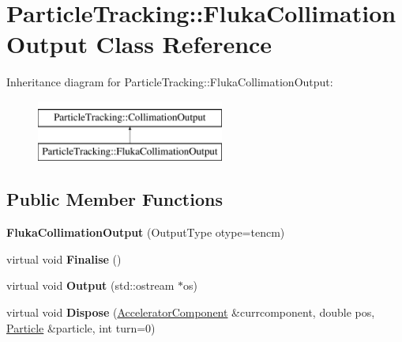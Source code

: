 \hypertarget{classParticleTracking_1_1FlukaCollimationOutput}{}\section{Particle\+Tracking\+:\+:Fluka\+Collimation\+Output Class Reference}
\label{classParticleTracking_1_1FlukaCollimationOutput}
Inheritance diagram for Particle\+Tracking\+:\+:Fluka\+Collimation\+Output\+:\begin{figure}[H]
\begin{center}
\leavevmode
\includegraphics[height=2.000000cm]{classParticleTracking_1_1FlukaCollimationOutput}
\end{center}
\end{figure}
\subsection*{Public Member Functions}
\begin{DoxyCompactItemize}
\item 
\mbox{\label{classParticleTracking_1_1FlukaCollimationOutput_a8939577857cd777d0af50875e2346b0b}} 
{\bfseries Fluka\+Collimation\+Output} (Output\+Type otype=tencm)
\item 
\mbox{\label{classParticleTracking_1_1FlukaCollimationOutput_aeed422d3b645564ccd7c88d414e6b1f7}} 
virtual void {\bfseries Finalise} ()
\item 
\mbox{\label{classParticleTracking_1_1FlukaCollimationOutput_a2cb04066285d2342c2b57225a0b1df3a}} 
virtual void {\bfseries Output} (std\+::ostream $\ast$os)
\item 
\mbox{\label{classParticleTracking_1_1FlukaCollimationOutput_aa32023d84ee6a923f28ca29bb48b33ae}} 
virtual void {\bfseries Dispose} (\hyperlink{classAcceleratorComponent}{Accelerator\+Component} \&currcomponent, double pos, \hyperlink{classPSvector}{Particle} \&particle, int turn=0)
\end{DoxyCompactItemize}
